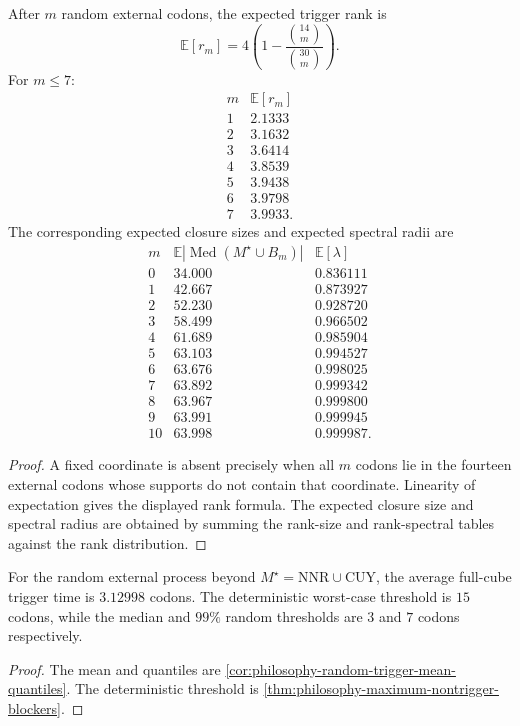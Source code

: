\begin{theorem}
\label{thm:philosophy-expected-rank-closure-spectrum}
After $m$ random external codons, the expected trigger rank is
$$
  \mathbb{E}[r_{m}]
  =
  4\left(1-\frac{\binom{14}{m}}{\binom{30}{m}}\right).
$$
For $m\leq 7$:
$$
\begin{array}{c|r}
  m & \mathbb{E}[r_{m}]\\
  \hline
  1 & 2.1333\\
  2 & 3.1632\\
  3 & 3.6414\\
  4 & 3.8539\\
  5 & 3.9438\\
  6 & 3.9798\\
  7 & 3.9933.
\end{array}
$$
The corresponding expected closure sizes and expected spectral radii
are
$$
\begin{array}{c|r|r}
  m & \mathbb{E}|\operatorname{Med}(M^{\star}\cup B_{m})| &
  \mathbb{E}[\lambda]\\
  \hline
  0 & 34.000 & 0.836111\\
  1 & 42.667 & 0.873927\\
  2 & 52.230 & 0.928720\\
  3 & 58.499 & 0.966502\\
  4 & 61.689 & 0.985904\\
  5 & 63.103 & 0.994527\\
  6 & 63.676 & 0.998025\\
  7 & 63.892 & 0.999342\\
  8 & 63.967 & 0.999800\\
  9 & 63.991 & 0.999945\\
  10 & 63.998 & 0.999987.
\end{array}
$$
\end{theorem}
\begin{proof}
A fixed coordinate is absent precisely when all $m$ codons lie in the
fourteen external codons whose supports do not contain that coordinate.
Linearity of expectation gives the displayed rank formula. The expected
closure size and spectral radius are obtained by summing the rank-size
and rank-spectral tables against the rank distribution.
\end{proof}

\begin{theorem}
\label{thm:philosophy-random-trigger-threshold-theorem}
For the random external process beyond
$M^{\star}=\mathrm{NNR}\cup\mathrm{CUY}$, the average full-cube trigger
time is $3.12998$ codons. The deterministic worst-case threshold is
$15$ codons, while the median and $99\%$ random thresholds are $3$ and
$7$ codons respectively.
\end{theorem}
\begin{proof}
The mean and quantiles are
\autoref{cor:philosophy-random-trigger-mean-quantiles}. The
deterministic threshold is
\autoref{thm:philosophy-maximum-nontrigger-blockers}.
\end{proof}
